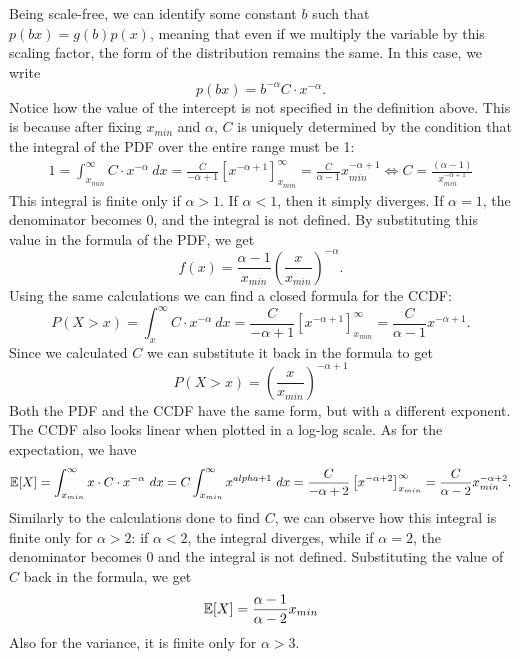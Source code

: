 Being scale-free, we can identify some constant $b$ such that $p(bx) = g(b)p(x)$, meaning that even if we multiply the variable by this scaling factor, the form of the distribution remains the same. In this case, we write
\[
    p(bx) = b^{-\alpha} C \cdot x^{-\alpha}.
\]
Notice how the value of the intercept is not specified in the definition above. This is because after fixing $x_{min}$ and $\alpha$, $C$ is uniquely determined by the condition that the integral of the PDF over the entire range must be 1:
\begin{align*}
    1 = \int_{x_{min}}^{\infty} C \cdot x^{-\alpha} \ dx = \frac{C}{-\alpha + 1}[x^{-\alpha + 1}]_{x_{min}}^{\infty} = \frac{C}{\alpha - 1} x_{min}^{-\alpha + 1} \iff \boxed{C = \frac{(\alpha - 1)}{x_{min}^{-\alpha + 1}}}
\end{align*}
This integral is finite only if $\alpha > 1$. If $\alpha < 1$, then it simply diverges. If $\alpha = 1$, the denominator becomes 0, and the integral is not defined. By substituting this value in the formula of the PDF, we get
\begin{equation*}
    f(x) = \frac{\alpha - 1}{x_{min}} \left ( \frac{x}{x_{min}} \right )^{-\alpha}.
\end{equation*}
Using the same calculations we can find a closed formula for the CCDF:
\begin{equation*}
    P(X > x) = \int_{x}^{\infty} C \cdot x^{-\alpha} \ dx = \frac{C}{-\alpha + 1}[x^{-\alpha + 1}]_{x_{min}}^{\infty} = \frac{C}{\alpha - 1} x^{-\alpha + 1}.
\end{equation*}
Since we calculated $C$ we can substitute it back in the formula to get
\begin{equation*}
    P(X > x) = \left ( \frac{x}{x_{min}} \right )^{-\alpha + 1}
\end{equation*}
Both the PDF and the CCDF have the same form, but with a different exponent. The CCDF also looks linear when plotted in a log-log scale.
As for the expectation, we have
\begin{equation*}
    \mathbb{E}[X] = \int_{x_{min}}^{\infty} x \cdot C \cdot x^{-\alpha} \ dx = C \int_{x_{min}}^{\infty} x^{\-alpha + 1} \ dx = \frac{C}{-\alpha + 2} \left [ x^{-\alpha + 2} \right ]_{x_{min}}^{\infty} = \frac{C}{\alpha - 2} x_{min}^{-\alpha + 2}.
\end{equation*}
Similarly to the calculations done to find $C$, we can observe how this integral is finite only for $\alpha > 2$: if $\alpha < 2$, the integral diverges, while if $\alpha = 2$, the denominator becomes 0 and the integral is not defined. Substituting the value of $C$ back in the formula, we get
\begin{equation*}
    \mathbb{E}[X] = \frac{\alpha - 1}{\alpha - 2} x_{min}
\end{equation*}
Also for the variance, it is finite only for $\alpha > 3$.

